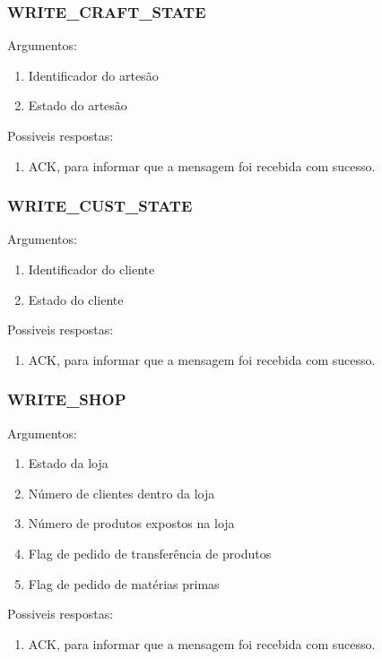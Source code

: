 \documentclass[11pt,a4paper]{report}
\begin{document}
\subsubsection{WRITE\_CRAFT\_STATE}
Argumentos:
\begin{enumerate}
    \itemsep-0.4em
    \item Identificador do artesão
    \item Estado do artesão
\end{enumerate}
Possiveis respostas:
\begin{enumerate}
    \itemsep-0.4em
    \item ACK, para informar que a mensagem foi recebida com sucesso.
\end{enumerate}

\subsubsection{WRITE\_CUST\_STATE}
Argumentos:
\begin{enumerate}
    \itemsep-0.4em
    \item Identificador do cliente
    \item Estado do cliente
\end{enumerate}
Possiveis respostas:
\begin{enumerate}
    \itemsep-0.4em
    \item ACK, para informar que a mensagem foi recebida com sucesso.
\end{enumerate}

\subsubsection{WRITE\_SHOP}
Argumentos:
\begin{enumerate}
    \itemsep-0.4em
    \item Estado da loja
    \item Número de clientes dentro da loja
    \item Número de produtos expostos na loja
    \item Flag de pedido de transferência de produtos
    \item Flag de pedido de matérias primas
\end{enumerate}
Possiveis respostas:
\begin{enumerate}
    \itemsep-0.4em
    \item ACK, para informar que a mensagem foi recebida com sucesso.
\end{enumerate}
\end{document}
